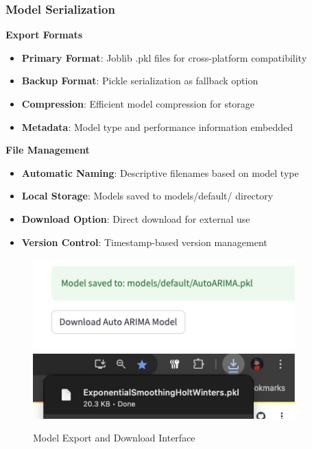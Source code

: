 \subsubsection{Model Serialization}

\textbf{Export Formats}
\begin{itemize}
	\item \textbf{Primary Format}: Joblib .pkl files for cross-platform compatibility
	\item \textbf{Backup Format}: Pickle serialization as fallback option
	\item \textbf{Compression}: Efficient model compression for storage
	\item \textbf{Metadata}: Model type and performance information embedded
\end{itemize}

\textbf{File Management}
\begin{itemize}
	\item \textbf{Automatic Naming}: Descriptive filenames based on model type
	\item \textbf{Local Storage}: Models saved to models/default/ directory
	\item \textbf{Download Option}: Direct download for external use
	\item \textbf{Version Control}: Timestamp-based version management
\end{itemize}

\begin{figure}[H]
	\centering
	\includegraphics[width=0.9\textwidth]{Images/05ApplicationFunctionsAndFeatures/ModelExport.png}
	\includegraphics[width=0.9\textwidth]{Images/05ApplicationFunctionsAndFeatures/DefaultModelDownLoaded.png}
	\caption{Model Export and Download Interface}
	\label{fig:model_export}
\end{figure}

